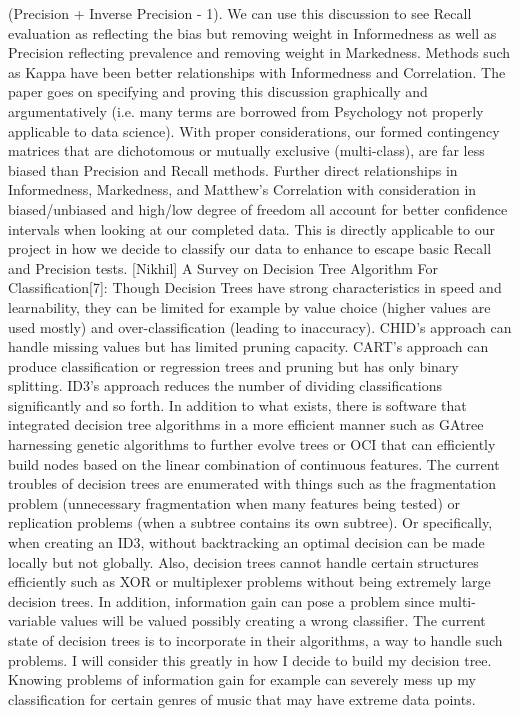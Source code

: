 \documentclass[acmtog, authorversion]{acmart}
\begin{document}
(Precision + Inverse Precision - 1). We can use this discussion to see Recall evaluation as reflecting the bias but removing weight in Informedness as 
well as Precision reflecting prevalence and removing weight in Markedness. Methods such as Kappa have been better relationships with Informedness and 
Correlation. The paper goes on specifying and proving this discussion graphically and argumentatively (i.e. many terms are borrowed from Psychology not 
properly applicable to data science). With proper considerations, our formed contingency matrices that are dichotomous or mutually exclusive 
(multi-class), are far less biased than Precision and Recall methods. Further direct relationships in Informedness, Markedness, and Matthew’s Correlation 
with consideration in biased/unbiased and high/low degree of freedom all account for better confidence intervals when looking at our completed data. This 
is directly applicable to our project in how we decide to classify our data to enhance to escape basic Recall and Precision tests. 
[Nikhil] A Survey on Decision Tree Algorithm For Classification[7]: Though Decision Trees have strong characteristics in speed and learnability, they can 
be limited for example by value choice (higher values are used mostly) and over-classification (leading to inaccuracy). CHID’s approach can handle missing 
values but has limited pruning capacity. CART’s approach can produce classification or regression trees and pruning but has only binary splitting. ID3’s 
approach reduces the number of dividing classifications significantly and so forth. In addition to what exists, there is software that integrated decision 
tree algorithms in a more efficient manner such as GAtree harnessing genetic algorithms to further evolve trees or OCI that can efficiently build nodes 
based on the linear combination of continuous features. The current troubles of decision trees are enumerated with things such as the fragmentation 
problem (unnecessary fragmentation when many features being tested) or replication problems (when a subtree contains its own subtree). Or specifically, 
when creating an ID3, without backtracking an optimal decision can be made locally but not globally. Also, decision trees cannot handle certain structures 
efficiently such as XOR or multiplexer problems without being extremely large decision trees. In addition, information gain can pose a problem since 
multi-variable values will be valued possibly creating a wrong classifier. The current state of decision trees is to incorporate in their algorithms, 
a way to handle such problems.  I will consider this greatly in how I decide to build my decision tree. Knowing problems of information gain for example 
can severely mess up my classification for certain genres of music that may have extreme data points. 
\end{document}
